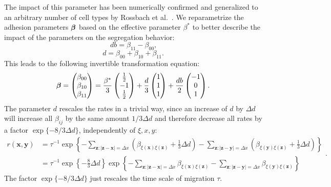 \documentclass[10pt,letterpaper]{article}
\begin{document}
The impact of this parameter has been numerically confirmed and generalized to
an arbitrary number of cell types by Rossbach et al.~\cite{RosBoeLanVos2021}.
We reparametrize the adhesion parameters $\text{\boldmath$\beta$}$
based on the effective parameter $\beta^*$ to better describe the
impact of the parameters on the segregation behavior:
%
\begin{equation}
  db=\beta_{11}-\beta_{00}\text{,}
\end{equation}
\begin{equation}
  d=\beta_{00}+\beta_{10}+\beta_{11}\text{.}
\end{equation}
%
This leads to the following invertible transformation equation:
%
\begin{equation}
  \text{\boldmath$\beta$}=\begin{pmatrix} \beta_{00} \\ \beta_{10} \\ \beta_{11} \end{pmatrix} = \frac{\beta^*}{3} \begin{pmatrix} \frac{1}{2} \\ -1 \\ \frac{1}{2} \end{pmatrix} + \frac{d}{3} \begin{pmatrix} 1 \\ 1 \\ 1 \end{pmatrix} + \frac{db}{2} \begin{pmatrix} -1 \\ 0 \\ 1 \end{pmatrix}\text{.}
\end{equation}
%
The parameter $d$ rescales the rates in a trivial way, since an
increase of $d$ by $\Delta d$ will increase all $\beta_{ij}$ by the
same amount $1/3\Delta d$ and therefore decrease all rates by a factor
$\exp\{-8/3\Delta d\}$, independently of $\xi,x,y$:
%
\begin{equation}
  \label{eq:rescaling}
  \begin{split}
    r(\textbf{x}, \textbf{y}) & = \tau^{-1} \exp\left\{-\sum_{\textbf{z}:|\textbf{z}-\textbf{x}|=\Delta x}{\left(\beta_{\xi(\textbf{x})\xi(\textbf{z})}+\frac{1}{3}\Delta d\right)} -\sum_{\textbf{z}:|\textbf{z}-\textbf{y}|=\Delta x}{\left(\beta_{\xi(\textbf{y})\xi(\textbf{z})} +\frac{1}{3}\Delta d\right)}\right\}\\
    & = \tau^{-1} \exp\left\{-\frac{8}{3}\Delta d\right\} \exp\left\{-\sum_{\textbf{z}:|\textbf{z}-\textbf{x}|=\Delta x}{\beta_{\xi(\textbf{x})\xi(\textbf{z})}} -\sum_{\textbf{z}:|\textbf{z}-\textbf{y}|=\Delta x}{\beta_{\xi(\textbf{y})\xi(\textbf{z})}}\right\}
  \end{split}\text{.}
\end{equation}
%
The factor $\exp\{-8/3\Delta d\}$ just rescales the time scale of
migration $\tau$.
\end{document}
